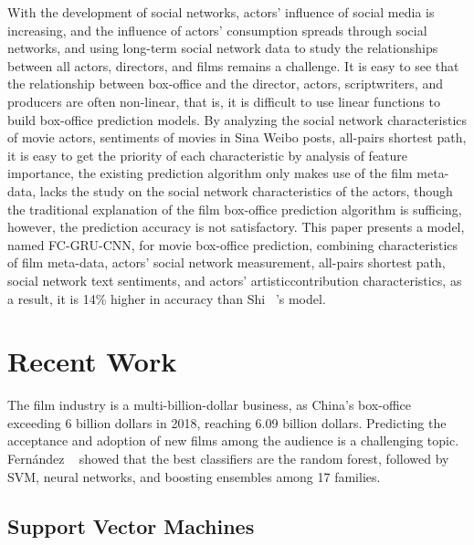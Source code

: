 \documentclass[review]{cvpr}
\begin{document}
  With the development of social networks, actors' influence of social media is increasing, and the influence of actors' consumption spreads through social networks,
  and using long-term social network data to study the relationships between all actors, directors, and films remains a challenge.
  It is easy to see that the relationship between box-office and the director, actors, scriptwriters, and producers are often non-linear, that is,
  it is difficult to use linear functions to build box-office prediction models.
  By analyzing the social network characteristics of movie actors, sentiments of movies in Sina Weibo posts, all-pairs shortest path,
  it is easy to get the priority of each characteristic by analysis of feature importance,
  the existing prediction algorithm only makes use of the film meta-data, lacks the study on the social network characteristics of the actors,
  though the traditional explanation of the film box-office prediction algorithm is sufficing, however, the prediction accuracy is not satisfactory.
  This paper presents a model, named FC-GRU-CNN, for movie box-office prediction, combining characteristics of film meta-data, actors' social network measurement,
  all-pairs shortest path, social network text sentiments, and actors' artisticcontribution characteristics,
  as a result, it is 14\% higher in accuracy than Shi \etal ~\cite{shi2019c}'s model.


\section{Recent Work}

  The film industry is a multi-billion-dollar business, as China's box-office exceeding 6 billion dollars in 2018, reaching 6.09 billion dollars.
  Predicting the acceptance and adoption of new films among the audience is a challenging topic.
  Fern{\'a}ndez \etal ~\cite{fernandez2014we} showed that the best classifiers are the random forest,
  followed by SVM, neural networks, and boosting ensembles among 17 families.


\subsection{Support Vector Machines}
\end{document}

